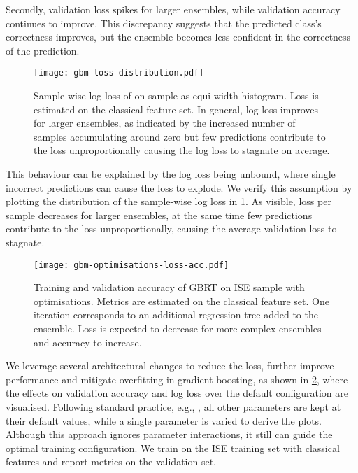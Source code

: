 Secondly, validation loss spikes for larger ensembles, while validation accuracy continues to improve. This discrepancy suggests that the predicted class's correctness improves, but the ensemble becomes less confident in the correctness of the prediction.

\begin{figure}[ht]
    \centering
    \texttt{[image: gbm-loss-distribution.pdf]}
    \caption[Sample-Wise Log Loss of  on  Sample]{Sample-wise log loss of  on  sample as equi-width histogram. Loss is estimated on the classical feature set. In general, log loss improves for larger ensembles, as indicated by the increased number of samples accumulating around zero but few predictions contribute to the loss unproportionally causing the log loss to stagnate on average.}
    \label{fig:gbm-loss-distribution}
\end{figure}

This behaviour can be explained by the log loss being unbound, where single incorrect predictions can cause the loss to explode. We verify this assumption by plotting the distribution of the sample-wise log loss in \cref{fig:gbm-loss-distribution}. As visible, loss per sample decreases for larger ensembles, at the same time few predictions contribute to the loss unproportionally, causing the average validation loss to stagnate.

\begin{figure}[ht]
    \centering
    \texttt{[image: gbm-optimisations-loss-acc.pdf]}
    \caption[Training and Validation Accuracy of  on  with Optimisations]{Training and validation accuracy of \gls{GBRT} on \gls{ISE} sample with optimisations. Metrics are estimated on the classical feature set. One iteration corresponds to an additional regression tree added to the ensemble. Loss is expected to decrease for more complex ensembles and accuracy to increase.}
    \label{fig:gbm-optimisations-loss-acc}
\end{figure}

We leverage several architectural changes to reduce the loss, further improve performance and mitigate overfitting in gradient boosting, as shown in \cref{fig:gbm-optimisations-loss-acc}, where the effects on validation accuracy and log loss over the default configuration are visualised. Following standard practice, e.g., \textcite{tuningplaybookgithub}, all other parameters are kept at their default values, while a single parameter is varied to derive the plots. Although this approach ignores parameter interactions, it still can guide the optimal training configuration. We train on the ISE training set with classical features and report metrics on the validation set.

